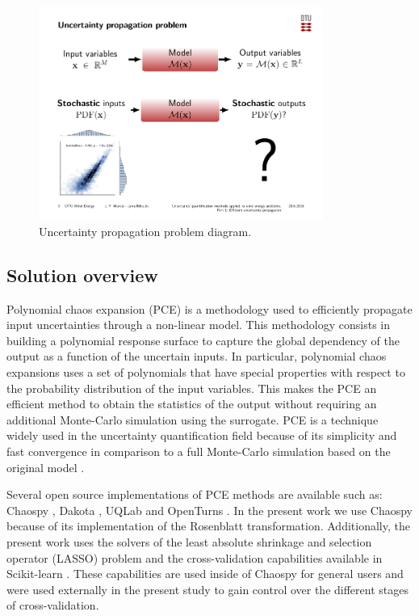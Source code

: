 \documentclass[preprint,12pt]{elsarticle}
\begin{document}
\begin{figure}[h!]
\begin{centering}
\includegraphics[width=22pc]{Figures/0_problem_statement.pdf}
\caption{Uncertainty propagation problem diagram.}
\label{fig_UQ_problem}
\end{centering}
\end{figure}


\subsection{Solution overview}


Polynomial chaos expansion (PCE) is a methodology used to efficiently propagate input uncertainties through a non-linear model. This methodology consists in building a polynomial response surface to capture the global dependency of the output as a function of the uncertain inputs. In particular, polynomial chaos expansions uses a set of polynomials that have special properties with respect to the probability distribution of the input variables. This makes the PCE an efficient method to obtain the statistics of the output without requiring an additional Monte-Carlo simulation using the surrogate. PCE is a technique widely used in the uncertainty quantification field because of its simplicity and fast convergence in comparison to a full Monte-Carlo simulation based on the original model \cite{soize2004physical, le2004uncertainty, choi2004polynomial, berveiller2006stochastic, xiu2005high, blatman2011adaptive}.

Several open source implementations of PCE methods are available such as: Chaospy \cite{feinberg2015chaospy}, Dakota \cite{eldred2007dakota}, UQLab \cite{marelli2014uqlab} and OpenTurns \cite{andrianov2007open}. In the present work we use Chaospy because of its implementation of the Rosenblatt transformation. Additionally, the present work uses the solvers of the least absolute shrinkage and selection operator (LASSO) problem \cite{tibshirani1996regression} and the cross-validation capabilities available in Scikit-learn \cite{pedregosa2011scikit}. These capabilities are used inside of Chaospy for general users and were used externally in the present study to gain control over the different stages of cross-validation.
\end{document}
